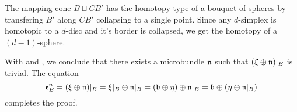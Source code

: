 \begin{myproof}
\begin{enumerate}
        The mapping cone $B \sqcup CB'$ has the homotopy type of a bouquet of spheres
        by transfering $B'$ along $CB'$ collapsing to a single point.
        Since any $d$-simplex is homotopic to a $d$-disc and it's border is collapsed, we get the homotopy of a $(d - 1)$-sphere.
        
        With  and ,
        we conclude that there exists a microbundle $\mathfrak{n}$ such that $(\xi \oplus{} \mathfrak{n})\vert_{B}$ is trivial.
        The equation
        \[
            \be{B}
            = (\whitney{\xi}{\bn})\restr{B}
            = \whitney{\xi\restr{B}}{\bn\restr{B}}
            = \whitney{(\whitney{\bb}{\eta})}{\bn\restr{B}}
            = \whitney{\bb}{(\whitney{\eta}{\bn\restr{B}})}
        \]
        completes the proof.
    \end{enumerate}
\end{myproof}